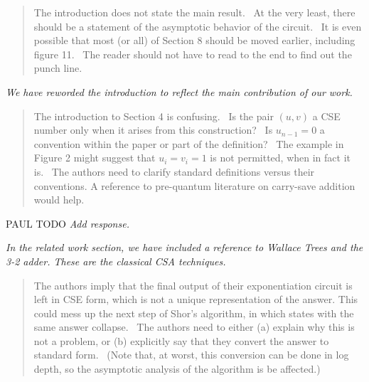 \documentclass{article}
\theoremstyle{plain} \newtheorem{lemma}{Lemma}
\begin{document}

\begin{quote}
The introduction does not state the main result.  At the very
least, there should be a statement of the asymptotic behavior of
the circuit.  It is even possible that most (or all) of Section 8
should be moved earlier, including figure 11.  The reader should not
have to read to the end to find out the punch line.
\end{quote}

{\it We have reworded the introduction to reflect the main contribution of our work.}


\begin{quote}
The introduction to Section 4 is confusing.  Is the pair $(u,v)$ a
CSE number only when it arises from this construction?  Is $u_{n-1} = 0 $
a convention within the paper or part of the definition?  The example
in Figure 2 might suggest that $u_i = v_i = 1$ is not permitted, when
in fact it is.  The authors need to clarify standard definitions versus
their conventions. A reference to pre-quantum literature on carry-save
addition would help.
\end{quote}

PAUL TODO
{\it Add response.}

{\it In the related work section, we have included a reference to Wallace Trees and the 3-2 adder.  These are the classical CSA techniques.}


\begin{quote}
The authors imply that the final output of their exponentiation circuit
is left in CSE form, which is not a unique representation of the answer.
This could mess up the next step of Shor's algorithm, in which states with
the same answer collapse.  The authors need to either (a) explain why this
is not a problem, or (b) explicitly say that they convert the answer to
standard form.  (Note that, at worst, this conversion can be done in log
depth, so the asymptotic analysis of the algorithm is be affected.)
\end{quote}
\end{document}
